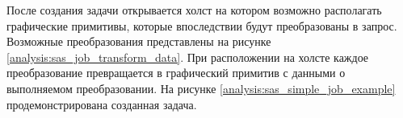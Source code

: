 \begin{figure}[ht!]
\end{figure}

\newpage

После создания задачи открывается холст на котором возможно располагать графические примитивы, которые впоследствии 
будут преобразованы в запрос. %
Возможные преобразования представлены на рисунке \ref{analysis:sas_job_transform_data}. 
При расположении на холсте каждое преобразование превращается в графический 
примитив с данными о выполняемом преобразовании.
На рисунке \ref{analysis:sas_simple_job_example} продемонстрирована созданная задача.

\begin{figure}[ht!]
\end{figure}


